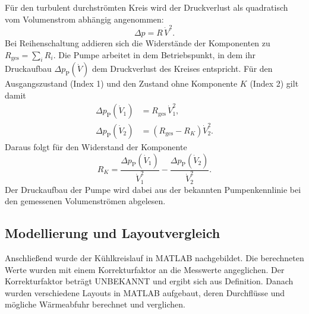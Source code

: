 Für den turbulent durchströmten Kreis wird der Druckverlust als quadratisch
vom Volumenstrom abhängig angenommen:
\begin{equation}
    \Delta p = R \, \dot{V}^{2}.
    \label{eq:druckverlust}
\end{equation}
Bei Reihenschaltung addieren sich die Widerstände der Komponenten zu
$R_\mathrm{ges} = \sum_i R_i$. Die Pumpe arbeitet in dem Betriebspunkt, in dem
ihr Druckaufbau $\Delta p_\mathrm{P}(\dot{V})$ dem Druckverlust des Kreises
entspricht. Für den Ausgangszustand (Index 1) und den Zustand ohne Komponente
$K$ (Index 2) gilt damit
\begin{align}
    \Delta p_\mathrm{P}(\dot{V}_1) &= R_\mathrm{ges}\,\dot{V}_1^{2}, \\
    \Delta p_\mathrm{P}(\dot{V}_2) &= \left(R_\mathrm{ges} - R_K\right)\dot{V}_2^{2}.
\end{align}
Daraus folgt für den Widerstand der Komponente
\begin{equation}
    R_K = \frac{\Delta p_\mathrm{P}(\dot{V}_1)}{\dot{V}_1^{2}}
        - \frac{\Delta p_\mathrm{P}(\dot{V}_2)}{\dot{V}_2^{2}}.
    \label{eq:widerstand_komponente}
\end{equation}
Der Druckaufbau der Pumpe wird dabei aus der bekannten Pumpenkennlinie bei
den gemessenen Volumenströmen abgelesen.



\subsection{Modellierung und Layoutvergleich}
\label{subsec:hydraulik_modell}

Anschließend wurde der Kühlkreislauf in MATLAB nachgebildet. Die berechneten
Werte wurden mit einem Korrekturfaktor an die Messwerte angeglichen. Der
Korrekturfaktor beträgt UNBEKANNT und ergibt sich aus Definition.
Danach wurden verschiedene Layouts in MATLAB aufgebaut, deren Durchflüsse
und mögliche Wärmeabfuhr berechnet und verglichen.

